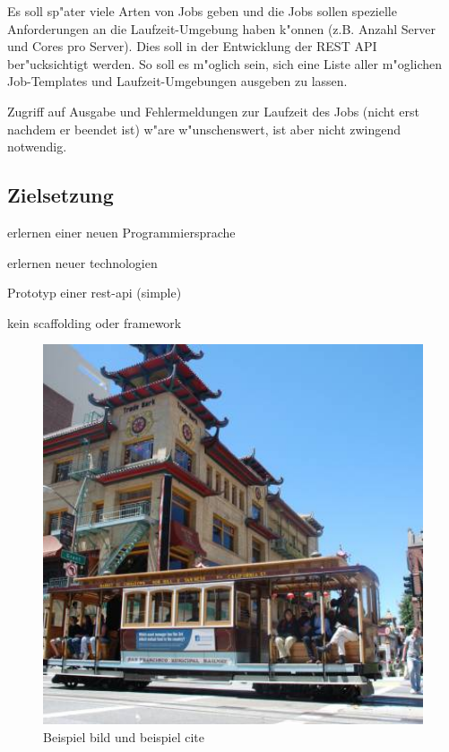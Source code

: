 \documentclass[12pt]{article}
\begin{document}
Es soll sp"ater viele Arten von Jobs geben und die Jobs sollen spezielle Anforderungen an die Laufzeit-Umgebung haben k"onnen (z.B. Anzahl Server und Cores pro Server). Dies soll in der Entwicklung der REST API ber"ucksichtigt werden. So soll es m"oglich sein, sich eine Liste aller m"oglichen Job-Templates und Laufzeit-Umgebungen ausgeben zu lassen.

Zugriff auf Ausgabe und Fehlermeldungen zur Laufzeit des Jobs (nicht erst nachdem er beendet ist) w"are w"unschenswert, ist aber nicht zwingend notwendig.



\subsection{Zielsetzung}

erlernen einer neuen Programmiersprache

erlernen neuer technologien

Prototyp einer rest-api (simple)

kein scaffolding oder framework

\begin{figure}[H]
  \centering
  \includegraphics[width=1\textwidth]{./images/lorem.jpeg}
  \captionsetup{name=Abb.,font=footnotesize}
  \caption{Beispiel bild und beispiel cite \supercite{WinNT}}
\end{figure}
\end{document}
